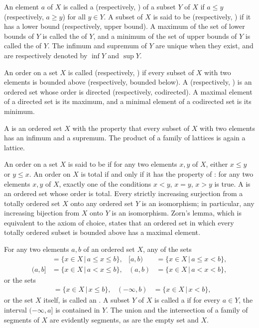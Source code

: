 \documentclass{article}
\begin{document}
An element \(a\) of \(X\) is called a 
(respectively, ) of a subset \(Y\) of \(X\) if
\(a \leq y\) (respectively, \(a \geq y\)) for all \(y \in Y\).  A
subset of \(X\) is said to be  (respectively,
) if it has a lower bound (respectively,
upper bound).  A maximum of the set of lower bounds of \(Y\) is called
the  of \(Y\), and a minimum of the set of upper
bounds of \(Y\) is called the  of \(Y\).  The
infimum and supremum of \(Y\) are unique when they exist, and are
respectively denoted by \(\inf Y\) and \(\sup Y\).

An order on a set \(X\) is called  (respectively,
) if every subset of \(X\) with two elements is
bounded above (respectively, bounded below).  A  (respectively, ) is an ordered set
whose order is directed (respectively, codirected).  A maximal element
of a directed set is its maximum, and a minimal element of a
codirected set is its minimum.

A  is an ordered set \(X\) with the property that
every subset of \(X\) with two elements has an infimum and a supremum.
The product of a family of lattices is again a lattice.

An order on a set \(X\) is said to be  if for any two
elements \(x, y\) of \(X\), either \(x \leq y\) or \(y \leq x\).  An
order on \(X\) is total if and only if it has the property of
: for any two elements \(x, y\) of \(X\),
exactly one of the conditions \(x < y\), \(x = y\), \(x > y\) is true.
A  is an ordered set whose order is
total.  Every strictly increasing surjection from a totally ordered
set \(X\) onto any ordered set \(Y\) is an isomorphism; in particular,
any increasing bijection from \(X\) onto \(Y\) is an isomorphism.
Zorn's lemma, which is equivalent to the axiom of choice, states that
an ordered set in which every totally ordered subset is bounded above
has a maximal element.

For any two elements \(a, b\) of an ordered set \(X\), any of the sets
\begin{align*}
  [a, b]& = \{ x \in X \,\vert\, a \leq x \leq b \},&
  [a, b)& = \{ x \in X \,\vert\, a \leq x < b \}, \\
  (a, b]& = \{ x \in X \,\vert\, a < x \leq b \},&
  (a, b)& = \{ x \in X \,\vert\, a < x < b \},
\end{align*}
or the sets
\begin{align*}
    [a, \infty)& = \{ x \in X \,\vert\, a \leq x \},&
  (a, \infty)& = \{ x \in X \,\vert\, a < x \}, \\
  (-\infty, b]& = \{ x \in X \,\vert\, x \leq b \},&
  (-\infty, b)& = \{ x \in X \,\vert\, x < b \},
\end{align*}
or the set \(X\) itself, is called an .  A subset
\(Y\) of \(X\) is called a  if for every
\(a \in Y\), the interval \((-\infty, a]\) is contained in \(Y\).  The
union and the intersection of a family of segments of \(X\) are
evidently segments, as are the empty set and \(X\).
\end{document}

